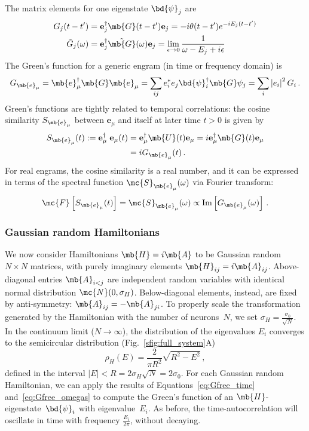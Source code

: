 The matrix elements for one eigenstate $\bd{\psi}_j$ are
\begin{align}
 G_j(t-t') &= \mathbf{e}_j^\dagger \mb{G}(t-t')\mathbf{e}_j =-i \theta(t-t') e^{-i E_j(t-t')}
 \label{eq:Gfree_time}
\\
\Tilde{G}_j(\omega) &= \mathbf{e}_j^\dagger \Tilde{\mb{G}}(\omega)\mathbf{e}_j =
\lim_{\epsilon \to 0} \frac{1}{\omega-E_j + i\epsilon}
\label{eq:Gfree_omegas}
\end{align}
The Green's function for a generic engram (in time or frequency domain) is
\begin{equation}
    G_{\mb{e}_\mu} = \mb{e}_\mu^\dagger \mb{G} \mb{e}_\mu =  \sum_{ij} e^*_i e_j \bd{\psi}_i^\dagger \mb{G} \psi_j = \sum_i \left|e_i\right|^2 G_i \,.
\end{equation}
Green's functions are tightly related to temporal correlations: the cosine similarity $S_{\mb{e}_\mu}$ between $\mathbf{e}_\mu$ and itself at later time $t>0$ is given by
\begin{align}
    S_{\mb{e}_\mu}(t)  := \mathbf{e}_\mu^\dagger \hspace{0.1cm}\mathbf{e}_\mu(t)
    & = \mathbf{e}_\mu^\dagger \mb{U}(t)\mathbf{e}_\mu  = i\mathbf{e}_\mu^\dagger \mb{G}(t)\mathbf{e}_\mu \\& = i G_{\mb{e}_\mu}(t) \,.
\end{align}
For real engrams, the cosine similarity is a real number, and it can be expressed in terms of the spectral function  $\mc{S}_{\mb{e}_\mu}(\omega)$ via Fourier transform:
\begin{align}
   \mc{F} \left[  S_{\mb{e}_\mu}(t) \right] = \mc{S}_{\mb{e}_\mu}(\omega) \propto
    \text{Im}  \left[  G_{\mb{e}_\mu}(\omega) \right] \,.
\end{align}

\subsubsection*{Gaussian random Hamiltonians}
We now consider Hamiltonians $\mb{H} = i\mb{A}$ to be Gaussian random $N\times N$ matrices, with purely imaginary elements $\mb{H}_{ij} = i\mb{A}_{ij}$. Above-diagonal entries $\mb{A}_{i<j}$ are independent random variables with identical  normal distribution $\mc{N}(0, \sigma_H)$. Below-diagonal elements, instead, are fixed by anti-symmetry:  $\mb{A}_{ij}= -\mb{A}_{ji}$.
To properly scale the transformation generated by the Hamiltonian with the number of neurons~$N$, we set $\sigma_H = \frac{\sigma_0}{\sqrt{N}}$.
In the continuum limit ($N\to\infty$), the distribution of the eigenvalues $E_i$ converges to the semicircular distribution (Fig.~\ref{sfig:full_system}A)
\begin{equation}
    \rho_H(E) = \frac{2}{\pi R^2}\sqrt{R^2 -E^2} \,,
    \label{eq:semicircle_law}
\end{equation}
defined in the interval $\left|E\right|<R = 2\sigma_H \sqrt{N}= 2\sigma_0$.
For each Gaussian random Hamiltonian, we can apply the results of Equations~\ref{eq:Gfree_time} and~\ref{eq:Gfree_omegas} to compute the Green's function of an $\mb{H}$-eigenstate~$\bd{\psi}_i$ with eigenvalue~$E_i$. As before, the time-autocorrelation will oscillate in time with frequency $\frac{E_i}{2\pi}$, without decaying.

